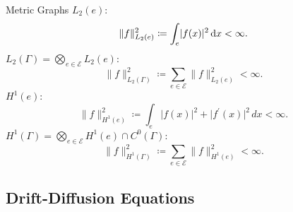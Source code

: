 \documentclass[9pt]{beamer}
\begin{document}
\begin{frame}{Metric Graphs}
    $L_2(e)$:
    \begin{equation*}
        \lVert f \rVert^{2}_{L_2(e)} \coloneqq \int_e \lvert f(x) \rvert^2 \, \textup{d} x < \infty.
    \end{equation*}
    \vspace{2mm}
    $L_2(\Gamma) = \bigotimes_{e \in \mathcal{E}} L_2(e)$:
    \begin{equation*}
        \lVert f \rVert^{2}_{L_2(\Gamma)} \coloneqq \sum_{e \in \mathcal{E}} \lVert f \rVert^{2}_{L_2(e)} < \infty.
    \end{equation*}
    \vspace{2mm}
    $H^1 (e)$:
    \begin{equation*}
        \lVert f \rVert^{2}_{H^1(e)} \coloneqq \int_e \lvert f(x) \rvert^2 + \lvert f^{\prime}(x) \rvert^2 \, dx < \infty.
    \end{equation*}
    \vspace{2mm}
    $H^1 (\Gamma) =  \bigotimes_{e \in \mathcal{E}} H^1 (e) \cap C^{0}(\Gamma)$:
    \begin{equation*}
        \lVert f \rVert^{2}_{H^1 (\Gamma)} \coloneqq \sum_{e \in \mathcal{E}} \lVert f \rVert^{2}_{H^1 (e)} < \infty.
    \end{equation*}
\end{frame}



\subsection{Drift-Diffusion Equations}
\end{document}
